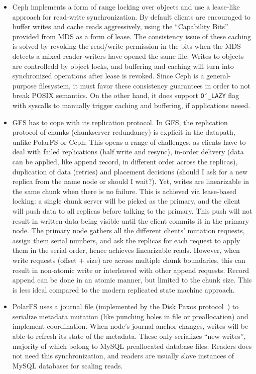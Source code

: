 \begin{itemize}
    \item Ceph implements a form of range locking over objects and use a
    lease-like approach for read-write synchronization. By default clients
    are encouraged to buffer writes and cache reads aggressively, using the
    ``Capability Bits'' provided from MDS as a form of lease. The consistency
    issue of these caching is solved by revoking the read/write permission in
    the bits when the MDS detects a mixed reader-writers have opened the same
    file. Writes to objects are controlledd by object locks, and buffering
    and caching will turn into synchronized operations after lease is
    revoked. Since Ceph is a general-purpose filesystem, it must favor these
    consistency guarantees in order to not break POSIX semantics. On the
    other hand, it does support \texttt{O\char`_LAZY} flag with syscalls to
    manually trigger caching and buffering, if applications neeed.

    \item GFS has to cope with its replication protocol. In GFS, the
    replication protocol of chunks (chunkserver redundancy) is explicit in
    the datapath, unlike PolarFS or Ceph. This opens a range of challenges,
    as clients have to deal with failed replications (half write and resync),
    in-order delivery (data can be applied, like append record, in different
    order across the replicas), duplication of data (retries) and placement
    decisions (should I ask for a new replica from the name node or should I
    wait?). Yet, writes are linearizable in the same
    chunk when there is no failure. This is achieved via lease-based locking:
    a single chunk server will be picked as the primary, and the client will
    push data to all replicas before talking to the primary. This push will
    not result in written-data being visible until the client commits it in
    the primary node. The primary node gathers all the different clients'
    mutation requests, assign them serial numbers, and ask the replicas for
    each request to apply them in the serial order, hence achieves
    linearizable reads. However, when write requests (offset $+$ size) are
    across multiple chunk boundaries, this can result in non-atomic write or
    interleaved with other append requests. Record append can be done in an
    atomic manner, but limited to the chunk size. This is less ideal compared
    to the modern replicated state machine approach.

    \item PolarFS uses a journal file (implemented by the Disk Paxos
    protocol~\cite{gafni2003disk}) to serialize metadata mutation (like
    punching holes in file or preallocation) and implement coordination. When
    node's journal anchor changes, writes will be able to refresh its state
    of the metadata. These only serializes ``new writes'', majority of which
    belong to MySQL preallocated database files. Readers does not need this
    synchronization, and readers are usually slave instances of MySQL
    databases for scaling reads.
\end{itemize}
